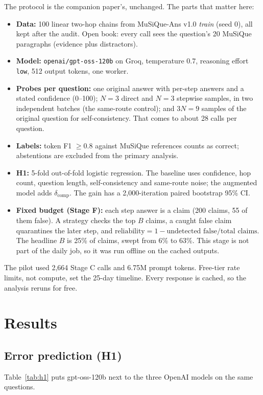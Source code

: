 \documentclass[11pt]{article}
\newcommand{\code}[1]{\texttt{#1}}
\begin{document}
The protocol is the companion paper's, unchanged. The parts that matter here:
\begin{itemize}
  \item \textbf{Data:} 100 linear two-hop chains from MuSiQue-Ans v1.0 \emph{train}
        (seed 0), all kept after the audit. Open book: every call sees the question's 20
        MuSiQue paragraphs (evidence plus distractors).
  \item \textbf{Model:} \code{openai/gpt-oss-120b} on Groq, temperature 0.7, reasoning
        effort \code{low}, 512 output tokens, one worker.
  \item \textbf{Probes per question:} one original answer with per-step answers and a
        stated confidence (0--100); $N = 3$ direct and $N = 3$ stepwise samples, in two
        independent batches (the same-route control); and $3N = 9$ samples of the original
        question for self-consistency. That comes to about 28 calls per question.
  \item \textbf{Labels:} token F1 $\geq 0.8$ against MuSiQue references counts as correct;
        abstentions are excluded from the primary analysis.
  \item \textbf{H1:} 5-fold out-of-fold logistic regression. The baseline uses confidence,
        hop count, question length, self-consistency and same-route noise; the augmented
        model adds $\delta_{\text{comp}}$. The gain has a 2,000-iteration paired bootstrap
        95\% CI.
  \item \textbf{Fixed budget (Stage F):} each step answer is a claim (200 claims, 55 of
        them false). A strategy checks the top $B$ claims, a caught false claim quarantines
        the later step, and
        $\text{reliability} = 1 - \text{undetected false} / \text{total claims}$. The
        headline $B$ is 25\% of claims, swept from 6\% to 63\%. This stage is not part of
        the daily job, so it was run offline on the cached outputs.
\end{itemize}
The pilot used 2,664 Stage C calls and 6.75M prompt tokens. Free-tier rate limits, not
compute, set the 25-day timeline. Every response is cached, so the analysis reruns for free.

\section{Results}

\subsection{Error prediction (H1)}
Table~\ref{tab:h1} puts gpt-oss-120b next to the three OpenAI models on the same questions.
\end{document}
